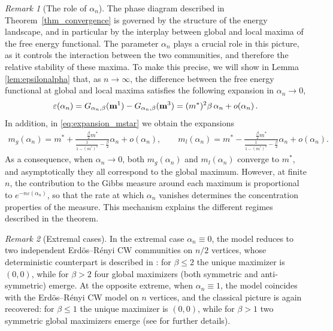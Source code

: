 \documentclass[11pt,oneside]{amsart}
\numberwithin{equation}{section}  %
\theoremstyle{plain}
\theoremstyle{remark}
\newtheorem{remark}{Remark}
\def \bm {{\bf m}}
\begin{document}
\begin{remark}[The role of $\alpha_n$]
The phase diagram described in Theorem~\ref{thm_convergence} is governed by the structure of the energy landscape, 
and in particular by the interplay between global and local maxima of the free energy functional. 
 The parameter $\alpha_n$ plays a crucial role in this picture, as it controls the interaction 
 between the two communities, and therefore the relative stability of these maxima. 
 To make this precise, we will show in Lemma \ref{lem:epsilonalpha} that, 
 as $n \to \infty$, the difference between the free energy functional at global and local maxima satisfies
 the following expansion in $\alpha_n\to 0$,
$$
\varepsilon(\alpha_n) = G_{\alpha_n,\beta}(\bm^1) - G_{\alpha_n,\beta}(\bm^3) = (m^*)^2\beta \, \alpha_n + o(\alpha_n)\,.
$$
In addition, in \eqref{eq:expansion_mstar} we obtain the expansions
\begin{align*}
m_g(\alpha_n)= m^* + \frac{\frac{\beta}{2}m^*}
{\frac{1}{1-(m^*)^2}-\frac{\beta}{2}}\alpha_n + o(\alpha_n), \qquad 
m_l(\alpha_n)= m^* -\frac{\frac{\beta}{2}m^*}
{\frac{1}{1-(m^*)^2}-\frac{\beta}{2}}\alpha_n + o(\alpha_n).
\end{align*}
As a consequence, when $\alpha_n \to 0$, both $m_g(\alpha_n)$ and $m_l(\alpha_n)$ converge to $m^*$, and asymptotically
they all correspond to the global maximum.
However, at finite $n$, the contribution to the Gibbs measure around each maximum is proportional to $e^{- n \varepsilon(\alpha_n)}$, 
so that the rate at which $\alpha_n$ vanishes determines the concentration properties of the measure. 
This mechanism explains the different regimes described in the theorem.
\end{remark}

\begin{remark}[Extremal cases]
In the extremal case $\alpha_n \equiv 0$, the model reduces to two independent Erd\"{o}s--R\'enyi CW communities on $n/2$ vertices, whose deterministic counterpart is described in \cite{C14}: for $\beta \le 2$ the unique maximizer is $(0,0)$, 
while for $\beta > 2$ four global maximizers (both symmetric and anti-symmetric) emerge.
At the opposite extreme, when $\alpha_n \equiv 1$, the model coincides with the Erd\"{o}s--R\'enyi CW model on $n$ vertices, and the classical picture is again recovered: for $\beta \le 1$ the unique maximizer is $(0,0)$, while for $\beta >1$ two symmetric global maximizers emerge (see \cite{BG93} for further details).\end{remark} 
\end{document}
